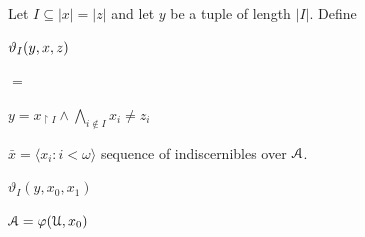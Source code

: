 \documentclass[10pt,openany]{book}
\def\Aa{\EuScript A}
\def\U{\EuScript U}
\def\<{\langle}
\def\>{\rangle}
\def\theta{\vartheta}
\def\phi{\varphi}
\theoremstyle{mio}
\theoremstyle{liscio}
\begin{document}
\def\medrel#1{\parbox[t]{6ex}{\hfil$#1$}}
\def\ceq#1#2#3{\parbox{25ex}{$\displaystyle #1$}\medrel{#2}$\displaystyle  #3$}


Let $I\subseteq |x|=|z|$ and let $y$ be a tuple of length $|I|$. Define

\ceq{\hfill\theta_I(y,x,z)}{=}{y=x_{\restriction I}\wedge\bigwedge_{i\notin I} x_i\neq z_i}

$\bar x=\<x_i:i<\omega\>$ sequence of indiscernibles over $\Aa$.

$\theta_I(y,x_0,x_1)$

$\Aa=\phi(\U,x_0)$
\end{document}
